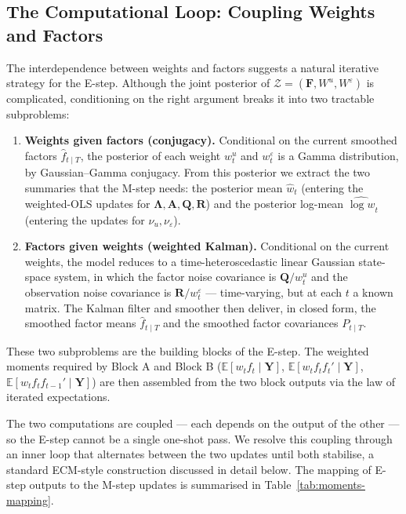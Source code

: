 \documentclass[11pt, a4paper, oneside]{article}
\newcommand{\mY}{\mathbf{Y}}
\newcommand{\mF}{\mathbf{F}}
\newcommand{\mL}{\boldsymbol{\Lambda}}
\newcommand{\mA}{\mathbf{A}}
\newcommand{\mR}{\mathbf{R}}
\newcommand{\mQ}{\mathbf{Q}}
\begin{document}
\newpage

\subsection{The Computational Loop: Coupling Weights and Factors}

The interdependence between weights and factors suggests a natural
iterative strategy for the E-step. Although the joint posterior of
$\mathcal{Z} = (\mF, W^u, W^\varepsilon)$ is complicated, conditioning
on the right argument breaks it into two tractable subproblems:

\begin{enumerate}[leftmargin=1.5em, itemsep=4pt]
    \item \textbf{Weights given factors (conjugacy).} Conditional on
          the current smoothed factors $\hat{f}_{t \mid T}$, the
          posterior of each weight $w^u_t$ and $w^\varepsilon_t$ is a
          Gamma distribution, by Gaussian--Gamma conjugacy. From this
          posterior we extract the two summaries that the M-step needs:
          the posterior mean $\hat{w}_t$ (entering the weighted-OLS
          updates for $\mL, \mA, \mQ, \mR$) and the posterior log-mean
          $\widehat{\log w}_t$ (entering the updates for $\nu_u,
          \nu_\varepsilon$).
    \item \textbf{Factors given weights (weighted Kalman).} Conditional
          on the current weights, the model reduces to a
          time-heteroscedastic linear Gaussian state-space system, in
          which the factor noise covariance is $\mQ / w^u_t$ and the
          observation noise covariance is $\mR / w^\varepsilon_t$ —
          time-varying, but at each $t$ a known matrix. The Kalman
          filter and smoother then deliver, in closed form, the
          smoothed factor means $\hat{f}_{t \mid T}$ and the smoothed
          factor covariances $P_{t \mid T}$.
\end{enumerate}

These two subproblems are the building blocks of the E-step.
The weighted moments required by Block A and Block B
($\mathbb{E}[w_t f_t \mid \mY]$, $\mathbb{E}[w_t f_t f_{t}' \mid \mY]$,
$\mathbb{E}[w_t f_t f_{t-1}' \mid \mY]$) are then assembled from the
two block outputs via the law of iterated expectations.

The two computations are coupled — each depends on the output of the
other — so the E-step cannot be a single one-shot pass. We resolve
this coupling through an inner loop that alternates between the two
updates until both stabilise, a standard ECM-style construction
discussed in detail below. The mapping of E-step outputs to the
M-step updates is summarised in Table~\ref{tab:moments-mapping}.
\end{document}

